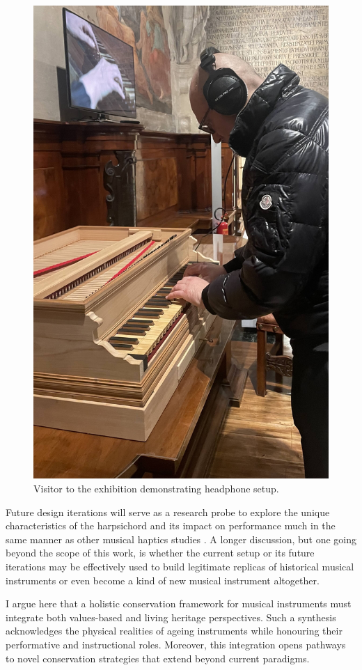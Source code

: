 \begin{figure}
    \centering
    \includegraphics[width=0.33\linewidth]{img/exhibition-user-1.jpeg}
    \caption{Visitor to the exhibition demonstrating headphone setup.}
    \label{fig:user}
\end{figure}\vfill

Future design iterations will serve as a research probe to explore the unique characteristics of the harpsichord and its impact on performance much in the same manner as other musical haptics studies \cite{charalampos-saitis_musical_2018}. A longer discussion, but one going beyond the scope of this work, is whether the current setup or its future iterations may be effectively used to build legitimate replicas of historical musical instruments or even become a kind of new musical instrument altogether.

I argue here that a holistic conservation framework for musical instruments must integrate both values-based and living heritage perspectives. Such a synthesis acknowledges the physical realities of ageing instruments while honouring their performative and instructional roles. Moreover, this integration opens pathways to novel conservation strategies that extend beyond current paradigms.
